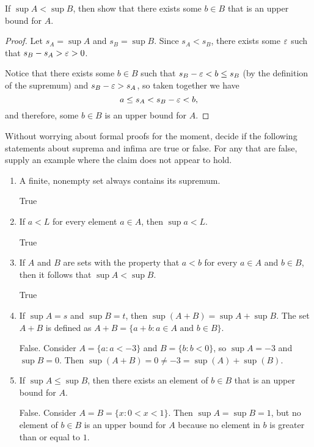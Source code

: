 \begin{problem} \label{prob:sup-upper-bound}
  If $\sup A < \sup B$, then show that there exists some $b \in B$ that is an upper bound for $A$.
\end{problem}

\begin{proof}
  Let $s_A = \sup A$ and $s_B = \sup B$. Since $s_A < s_B$, there exists some
  $\varepsilon$ such that $s_B - s_A > \varepsilon > 0$. 

  Notice that there exists some $b \in B$ such that $s_B - \varepsilon < b \leq s_B$
  (by the definition of the supremum) and $s_B - \varepsilon > s_A$, so taken together
  we have 
  \[
    a \leq s_A < s_B - \varepsilon < b,
  \]
  and therefore, some $b \in B$ is an upper bound for $A$.
\end{proof}

\begin{problem} \label{prob:sup-inf-claims}
  Without worrying about formal proofs for the moment, decide if the following
  statements about suprema and infima are true or false. For any that are false,
  supply an example where the claim does not appear to hold.

  \begin{enumerate}[label=(\alph*)]
    \item A finite, nonempty set always contains its supremum. 

      True

    \item If $a < L$ for every element $a \in A$, then $\sup a < L$.

      True

    \item If $A$ and $B$ are sets with the property that $a < b$ for every $a
      \in A$ and $b \in B$, then it follows that $\sup A < \sup B$.

      True

    \item If $\sup A = s$ and $\sup B = t$, then $\sup (A + B) = \sup A + \sup B$.
      The set $A + B$ is defined as $A + B = \{a + b : a \in A \text{ and } b \in B\}$.

      False. Consider $A = \{ a : a < -3 \}$ and $B = \{ b : b < 0 \}$, so
      $\sup A = -3$ and $\sup B = 0$. Then $\sup(A + B) = 0 \neq -3 = \sup(A) +
      \sup(B)$.

    \item If $\sup A \leq \sup B$, then there exists an element of $b \in B$
      that is an upper bound for $A$. 

      False. Consider $A = B = \{ x : 0 < x < 1 \}$. Then $\sup A = \sup B = 1$,
      but no element of $b \in B$ is an upper bound for $A$ because no element
      in $b$ is greater than or equal to $1$.

  \end{enumerate}

\end{problem}
